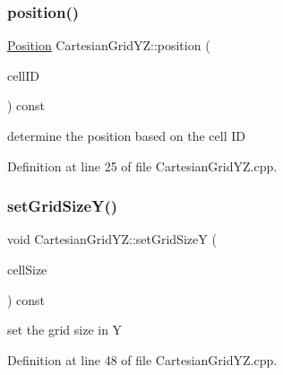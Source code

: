 \subsubsection{\texorpdfstring{position()}{position()}}
{\footnotesize\ttfamily \hyperlink{namespace_d_d4hep_1_1_geometry_a55083902099d03506c6db01b80404900}{Position} Cartesian\+Grid\+Y\+Z\+::position (\begin{DoxyParamCaption}\item[{const Cell\+ID \&}]{cell\+ID }\end{DoxyParamCaption}) const}



determine the position based on the cell ID 



Definition at line 25 of file Cartesian\+Grid\+Y\+Z.\+cpp.

\hypertarget{class_d_d4hep_1_1_geometry_1_1_cartesian_grid_y_z_a0acf6f4efeac643d8417497baa15cec2}{}\label{class_d_d4hep_1_1_geometry_1_1_cartesian_grid_y_z_a0acf6f4efeac643d8417497baa15cec2} 
\subsubsection{\texorpdfstring{set\+Grid\+Size\+Y()}{setGridSizeY()}}
{\footnotesize\ttfamily void Cartesian\+Grid\+Y\+Z\+::set\+Grid\+SizeY (\begin{DoxyParamCaption}\item[{double}]{cell\+Size }\end{DoxyParamCaption}) const}



set the grid size in Y 



Definition at line 48 of file Cartesian\+Grid\+Y\+Z.\+cpp.

\hypertarget{class_d_d4hep_1_1_geometry_1_1_cartesian_grid_y_z_ab904fec573166268aa54888d3857256b}{}\label{class_d_d4hep_1_1_geometry_1_1_cartesian_grid_y_z_ab904fec573166268aa54888d3857256b} 
